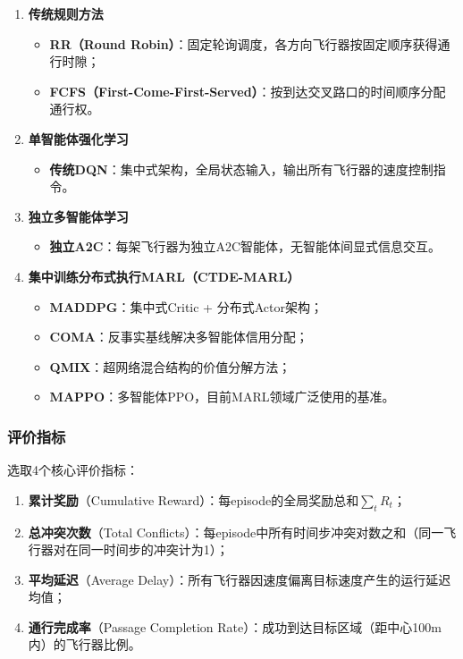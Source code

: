 \documentclass[12pt,a4paper,UTF8]{ctexart}
\begin{document}
\begin{enumerate}[label=\textbf{第\arabic*组：}]
    \item \textbf{传统规则方法}
    \begin{itemize}
        \item \textbf{RR（Round Robin）}：固定轮询调度，各方向飞行器按固定顺序获得通行时隙；
        \item \textbf{FCFS（First-Come-First-Served）}：按到达交叉路口的时间顺序分配通行权。
    \end{itemize}
    \item \textbf{单智能体强化学习}
    \begin{itemize}
        \item \textbf{传统DQN}：集中式架构，全局状态输入，输出所有飞行器的速度控制指令。
    \end{itemize}
    \item \textbf{独立多智能体学习}
    \begin{itemize}
        \item \textbf{独立A2C}：每架飞行器为独立A2C智能体，无智能体间显式信息交互。
    \end{itemize}
    \item \textbf{集中训练分布式执行MARL（CTDE-MARL）}
    \begin{itemize}
        \item \textbf{MADDPG}：集中式Critic + 分布式Actor架构；
        \item \textbf{COMA}：反事实基线解决多智能体信用分配；
        \item \textbf{QMIX}：超网络混合结构的价值分解方法；
        \item \textbf{MAPPO}：多智能体PPO，目前MARL领域广泛使用的基准。
    \end{itemize}
\end{enumerate}

\subsubsection{评价指标}

选取4个核心评价指标：
\begin{enumerate}[label=(\arabic*)]
    \item \textbf{累计奖励}（Cumulative Reward）：每episode的全局奖励总和$\sum_t R_t$；
    \item \textbf{总冲突次数}（Total Conflicts）：每episode中所有时间步冲突对数之和（同一飞行器对在同一时间步的冲突计为1）；
    \item \textbf{平均延迟}（Average Delay）：所有飞行器因速度偏离目标速度产生的运行延迟均值；
    \item \textbf{通行完成率}（Passage Completion Rate）：成功到达目标区域（距中心100m内）的飞行器比例。
\end{enumerate}
\end{document}
